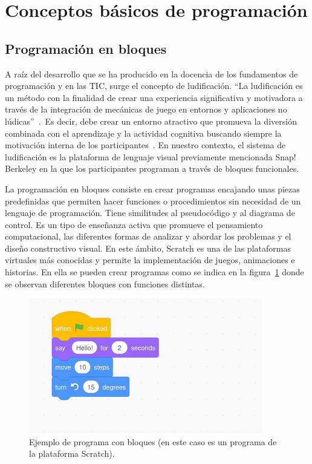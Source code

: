 \documentclass[a4paper, 12pt]{book}
\begin{document}
\section{Conceptos básicos de programación}

\subsection{Programación en bloques}
A raíz del desarrollo que se ha producido en la docencia de los fundamentos de programación y en las TIC, surge el concepto de ludificación. ``La ludificación es un método con la finalidad de crear una experiencia significativa y motivadora a través de la integración de mecánicas de juego en entornos y aplicaciones no lúdicas''~\cite{lopez2017pensamiento}.~Es decir, debe crear un entorno atractivo que promueva la diversión combinada con el aprendizaje y la actividad cognitiva buscando siempre la motivación interna de los participantes~\cite{vsimko2014ludificacion}. En nuestro contexto, el sistema de ludificación es la plataforma de lenguaje visual previamente mencionada Snap! Berkeley en la que los participantes programan a través de bloques funcionales.

La programación en bloques consiste en crear programas encajando unas piezas predefinidas que permiten hacer funciones o procedimientos sin necesidad de un lenguaje de programación. Tiene similitudes al pseudocódigo y al diagrama de control. Es un tipo de enseñanza activa que promueve el pensamiento computacional, las diferentes formas de analizar y abordar los problemas y el diseño constructivo visual.
En este ámbito, Scratch es una de las plataformas virtuales más conocidas y permite la implementación de juegos, animaciones e historias. En ella se pueden crear programas como se indica en la figura~\ref{figura:scratch} donde se observan diferentes bloques con funciones distintas.
\begin{figure}[h]
        \centering
        \includegraphics[scale=0.55]{img/scratch.png}
        \caption{Ejemplo de programa con bloques (en este caso es un programa de la plataforma Scratch).}
        \label{figura:scratch}
\end{figure}
\end{document}
